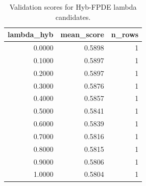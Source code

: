 \begin{table}[t]
\caption{Validation scores for Hyb-FPDE lambda candidates.}
\label{tab:lambda_distribution_computed}
\centering
\begin{tabular}{rrr}
\toprule
lambda\_hyb & mean\_score & n\_rows \\
\midrule
0.0000 & 0.5898 & 1 \\
0.1000 & 0.5897 & 1 \\
0.2000 & 0.5897 & 1 \\
0.3000 & 0.5876 & 1 \\
0.4000 & 0.5857 & 1 \\
0.5000 & 0.5841 & 1 \\
0.6000 & 0.5839 & 1 \\
0.7000 & 0.5816 & 1 \\
0.8000 & 0.5815 & 1 \\
0.9000 & 0.5806 & 1 \\
1.0000 & 0.5804 & 1 \\
\bottomrule
\end{tabular}

\end{table}
